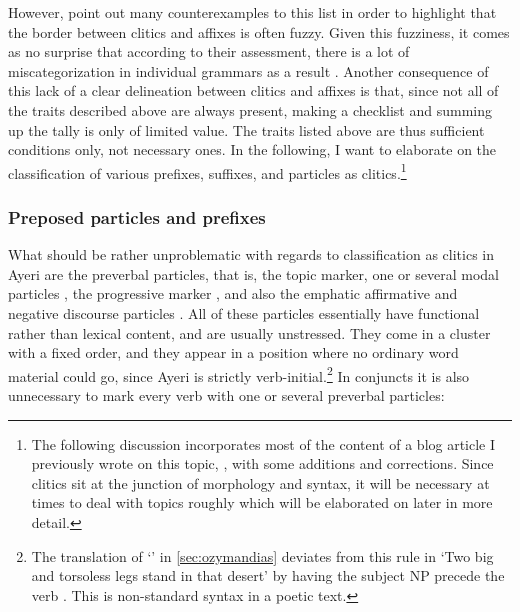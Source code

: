 However, \citet{spencerluis2012} point out many counterexamples to this list in
order to highlight that the border between clitics and affixes is often fuzzy.
Given this fuzziness, it comes as no surprise that according to their
assessment, there is a lot of miscategorization in individual grammars as a
result \citep[107]{spencerluis2012}. Another consequence of this lack of a
clear delineation between clitics and affixes is that, since not all of the
traits described above are always present, making a checklist and summing up
the tally is only of limited value. The traits listed above are thus sufficient
conditions only, not necessary ones. In the following, I want to elaborate on
the classification of various prefixes, suffixes, and particles as
clitics.\footnote{The following discussion incorporates most of the content of
a blog article I previously wrote on this topic, \citet{benung:clitics}, with
some additions and corrections. Since clitics sit at the junction of morphology
and syntax, it will be necessary at times to deal with topics roughly which
will be elaborated on later in more detail.}

\subsubsection{Preposed particles and prefixes}

\label{clitics_preverb} What should be rather unproblematic with regards to
classification as clitics in Ayeri are the preverbal particles, that is, the
topic  marker, one or several modal particles , the progressive marker , and also the
emphatic affirmative and negative discourse particles . All of these particles essentially have functional rather than
lexical content, and are usually unstressed. They come in a cluster with a
fixed order, and they appear in a position where no ordinary word material
could go, since Ayeri is strictly verb-initial.\footnote{The translation of
`' in \autoref{sec:ozymandias} deviates from
this rule in 
  `Two big and torsoless legs stand in that desert' by having the
subject NP  precede the verb
. This is non-standard syntax in a
poetic text.} In conjuncts it is also unnecessary to mark every verb with one
or several preverbal particles:

